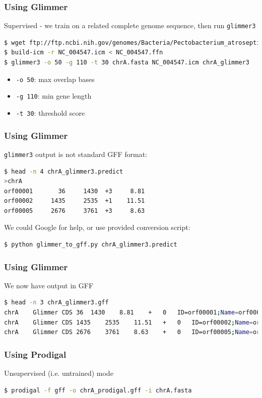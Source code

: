 \documentclass[table]{beamer}
\begin{document}
\begin{frame}[fragile]
\frametitle{Using Glimmer}
Supervised - we train on a related complete genome sequence, then run \texttt{glimmer3}
\begin{lstlisting}[language=bash]
$ wget ftp://ftp.ncbi.nih.gov/genomes/Bacteria/Pectobacterium_atrosepticum_SCRI1043_uid57957/NC_004547.ffn
$ build-icm -r NC_004547.icm < NC_004547.ffn
$ glimmer3 -o 50 -g 110 -t 30 chrA.fasta NC_004547.icm chrA_glimmer3
\end{lstlisting}
    \begin{itemize}
      \item \texttt{-o 50}: max overlap bases
      \item \texttt{-g 110}: min gene length
      \item \texttt{-t 30}:  threshold score
    \end{itemize}
\end{frame}

\begin{frame}[fragile]
\frametitle{Using Glimmer}
\texttt{glimmer3} output is not standard GFF format:
\begin{lstlisting}[language=bash]
$ head -n 4 chrA_glimmer3.predict 
>chrA
orf00001       36     1430  +3     8.81
orf00002     1435     2535  +1    11.51
orf00005     2676     3761  +3     8.63
\end{lstlisting}
We could Google for help, or use provided conversion script:
\begin{lstlisting}[language=bash]
$ python glimmer_to_gff.py chrA_glimmer3.predict
\end{lstlisting}    
\end{frame}

\begin{frame}[fragile]
\frametitle{Using Glimmer}
We now have output in GFF
\begin{lstlisting}[language=bash]
$ head -n 3 chrA_glimmer3.gff 
chrA	Glimmer	CDS	36	1430	8.81	+	0	ID=orf00001;Name=orf00001
chrA	Glimmer	CDS	1435	2535	11.51	+	0	ID=orf00002;Name=orf00002
chrA	Glimmer	CDS	2676	3761	8.63	+	0	ID=orf00005;Name=orf00005
\end{lstlisting}
\end{frame}

\begin{frame}[fragile]
\frametitle{Using Prodigal}
Unsupervised (i.e. untrained) mode
\begin{lstlisting}[language=bash]
$ prodigal -f gff -o chrA_prodigal.gff -i chrA.fasta
\end{lstlisting}
\end{frame}
\end{document}
